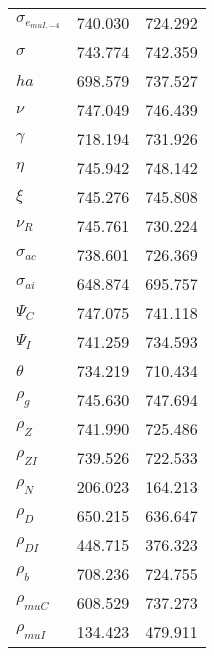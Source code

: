 \begin{center}
\begin{longtable}{lcc}
$ \sigma_{{e_{muI,-4}}}   $	 & 	     740.030	 & 	     724.292 \\ 
$ {\sigma}                $	 & 	     743.774	 & 	     742.359 \\ 
$ {ha}                    $	 & 	     698.579	 & 	     737.527 \\ 
$ \nu                     $	 & 	     747.049	 & 	     746.439 \\ 
$ \gamma                  $	 & 	     718.194	 & 	     731.926 \\ 
$ {\eta}                  $	 & 	     745.942	 & 	     748.142 \\ 
$ \xi                     $	 & 	     745.276	 & 	     745.808 \\ 
$ {\nu_R}                 $	 & 	     745.761	 & 	     730.224 \\ 
$ {\sigma_{ac}}           $	 & 	     738.601	 & 	     726.369 \\ 
$ {\sigma_{ai}}           $	 & 	     648.874	 & 	     695.757 \\ 
$ {\Psi_{C}}              $	 & 	     747.075	 & 	     741.118 \\ 
$ {\Psi_I}                $	 & 	     741.259	 & 	     734.593 \\ 
$ {\theta}                $	 & 	     734.219	 & 	     710.434 \\ 
$ {\rho_g}                $	 & 	     745.630	 & 	     747.694 \\ 
$ {\rho_Z}                $	 & 	     741.990	 & 	     725.486 \\ 
$ {\rho_{ZI}}             $	 & 	     739.526	 & 	     722.533 \\ 
$ {\rho_N}                $	 & 	     206.023	 & 	     164.213 \\ 
$ {\rho_D}                $	 & 	     650.215	 & 	     636.647 \\ 
$ {\rho_{DI}}             $	 & 	     448.715	 & 	     376.323 \\ 
$ {\rho_b}                $	 & 	     708.236	 & 	     724.755 \\ 
$ {\rho_{muC}}            $	 & 	     608.529	 & 	     737.273 \\ 
$ {\rho_{muI}}            $	 & 	     134.423	 & 	     479.911 \\ 
\end{longtable}
 \end{center}
